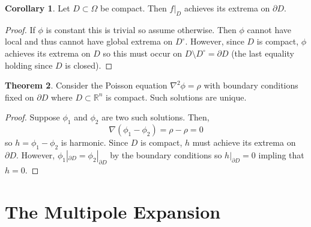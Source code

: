 \documentclass[12pt]{extarticle}
\newcommand{\R}{\mathbb{R}}
\theoremstyle{definition}
\newtheorem{theorem}{Theorem}[section]
\newtheorem{corollary}[theorem]{Corollary}
\begin{document}
\begin{corollary}
Let $D \subset \Omega$ be compact. Then $f|_D$ achieves its extrema on $\partial D$. 
\end{corollary}

\begin{proof}
If $\phi$ is constant this is trivial so assume otherwise. Then $\phi$ cannot have local and thus cannot have global extrema on $D^\circ$. However, since $D$ is compact, $\phi$ achieves its extrema on $D$ so this must occur on $D \setminus D^\circ = \partial D$ (the last equality holding since $D$ is closed). 
\end{proof}

\begin{theorem}
Consider the Poisson equation $\nabla^2 \phi = \rho$ with boundary conditions fixed on $\partial D$ where $D \subset \R^n$ is compact. Such solutions are unique. 
\end{theorem}

\begin{proof}
Suppose $\phi_1$ and $\phi_2$ are two such solutions. Then,
\[ \nabla (\phi_1 - \phi_2) = \rho - \rho = 0 \]
so $h = \phi_1 - \phi_2$ is harmonic. Since $D$ is compact, $h$ must achieve its extrema on $\partial D$. However, $\phi_1 |_{\partial D} = \phi_2 |_{\partial D}$ by the boundary conditions so $h|_{\partial D} = 0$ impling that $h = 0$. 
\end{proof}

\section{The Multipole Expansion}

\newcommand{\ev}{\mathrm{ev}}
\end{document}
